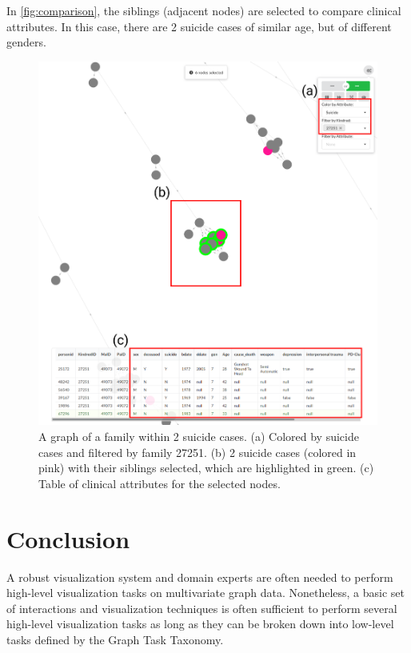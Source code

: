 \documentclass{vgtc}                          %
\begin{document}
In \autoref{fig:comparison}, the siblings (adjacent nodes) are selected to compare clinical attributes. In this case, there are 2 suicide cases of similar age, but of different genders.

\begin{figure}[tb]
 \centering %
 \includegraphics[width=\columnwidth]{pictures/comparison.png}
 \caption{A graph of a family within 2 suicide cases. (a) Colored by suicide cases and filtered by family 27251. (b) 2 suicide cases (colored in pink) with their siblings selected, which are highlighted in green. (c) Table of clinical attributes for the selected nodes.}
 \label{fig:comparison}
\end{figure}

\section{Conclusion}
A robust visualization system and domain experts are often needed to perform high-level visualization tasks on multivariate graph data. Nonetheless, a basic set of interactions and visualization techniques is often sufficient to perform several high-level visualization tasks as long as they can be broken down into low-level tasks defined by the Graph Task Taxonomy.


%

%
%
%


\end{document}

